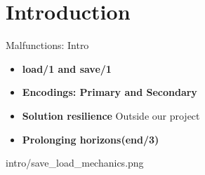 \section{Introduction}


\begin{frame}{Malfunctions: Intro}
\begin{minipage}{0.5\textwidth}
	\begin{itemize}
		\item \textbf{load/1 and save/1} 
		\item \textbf{Encodings: Primary and Secondary}
		\item \textbf{Solution resilience}	 Outside our project
		\item \textbf{Prolonging horizons(end/3)}		
	\end{itemize}
\end{minipage}
\begin{minipage}{0.45\textwidth}

		\begin{overpic}[width=\textwidth]{intro/save_load_mechanics.png}
		\end{overpic}

\end{minipage}

\end{frame}

